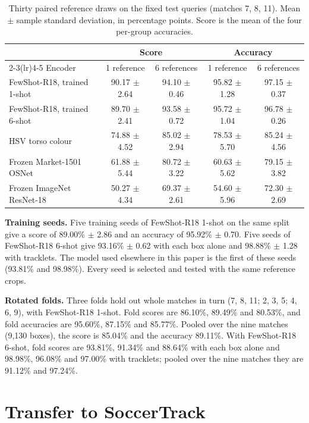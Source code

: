 \documentclass[10pt]{article}
\begin{document}
\begin{table}[tbp]
\centering
\caption{Thirty paired reference draws on the fixed test queries (matches 7, 8, 11). Mean $\pm$ sample standard deviation, in percentage points. Score is the mean of the four per-group accuracies.}
\label{tab:draws}
\small
\begin{tabular}{lcccc}
\toprule
 & \multicolumn{2}{c}{Score} & \multicolumn{2}{c}{Accuracy} \\
\cmidrule(lr){2-3}\cmidrule(lr){4-5}
Encoder & 1 reference & 6 references & 1 reference & 6 references \\
\midrule
FewShot-R18, trained 1-shot & 90.17 $\pm$ 2.64 & 94.10 $\pm$ 0.46 & 95.82 $\pm$ 1.28 & 97.15 $\pm$ 0.37 \\
FewShot-R18, trained 6-shot & 89.70 $\pm$ 2.41 & 93.58 $\pm$ 0.72 & 95.72 $\pm$ 1.04 & 96.78 $\pm$ 0.26 \\
HSV torso colour & 74.88 $\pm$ 4.52 & 85.02 $\pm$ 2.94 & 78.53 $\pm$ 5.70 & 85.24 $\pm$ 4.56 \\
Frozen Market-1501 OSNet & 61.88 $\pm$ 5.44 & 80.72 $\pm$ 3.22 & 60.63 $\pm$ 5.62 & 79.15 $\pm$ 3.82 \\
Frozen ImageNet ResNet-18 & 50.27 $\pm$ 4.34 & 69.37 $\pm$ 2.61 & 54.60 $\pm$ 5.96 & 72.30 $\pm$ 2.69 \\
\bottomrule
\end{tabular}
\end{table}

\textbf{Training seeds.} Five training seeds of FewShot-R18 1-shot on the same split give a score of 89.00\% $\pm$ 2.86 and an accuracy of 95.92\% $\pm$ 0.70. Five seeds of FewShot-R18 6-shot give 93.16\% $\pm$ 0.62 with each box alone and 98.88\% $\pm$ 1.28 with tracklets. The model used elsewhere in this paper is the first of these seeds (93.81\% and 98.98\%). Every seed is selected and tested with the same reference crops.

\textbf{Rotated folds.} Three folds hold out whole matches in turn (7, 8, 11; 2, 3, 5; 4, 6, 9), with FewShot-R18 1-shot. Fold scores are 86.10\%, 89.49\% and 80.53\%, and fold accuracies are 95.60\%, 87.15\% and 85.77\%. Pooled over the nine matches (9,130 boxes), the score is 85.04\% and the accuracy 89.11\%. With FewShot-R18 6-shot, fold scores are 93.81\%, 91.34\% and 88.64\% with each box alone and 98.98\%, 96.08\% and 97.00\% with tracklets; pooled over the nine matches they are 91.12\% and 97.24\%.

\section{Transfer to SoccerTrack}
\label{sec:transfer}
\end{document}
